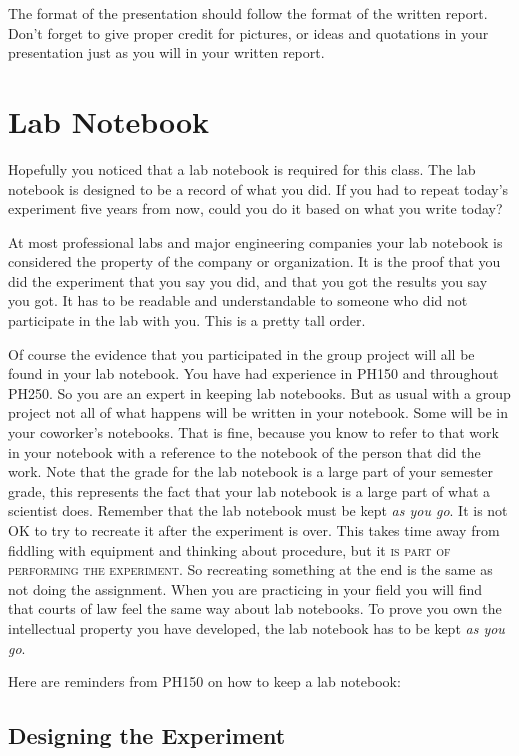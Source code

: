 The format of the presentation should follow the format of the written
report. Don't forget to give proper credit for pictures, or ideas and
quotations in your presentation just as you will in your written report.

\section{Lab Notebook}

Hopefully you noticed that a lab notebook is required for this class. The
lab notebook is designed to be a record of what you did. If you had to
repeat today's experiment five years from now, could you do it based on what
you write today?

At most professional labs and major engineering companies your lab notebook
is considered the property of the company or organization. It is the proof
that you did the experiment that you say you did, and that you got the
results you say you got. It has to be readable and understandable to someone
who did not participate in the lab with you. This is a pretty tall order.

Of course the evidence that you participated in the group project will all
be found in your lab notebook. You have had experience in PH150 and
throughout PH250. So you are an expert in keeping lab notebooks. But as
usual with a group project not all of what happens will be written in your
notebook. Some will be in your coworker's notebooks. That is fine, because
you know to refer to that work in your notebook with a reference to the
notebook of the person that did the work. Note that the grade for the lab
notebook is a {\Large large} part of your semester grade, this represents
the fact that your lab notebook is a {\Large large} part of what a scientist
does. Remember that the lab notebook must be kept \emph{as you go}. It is
not OK to try to recreate it after the experiment is over. This takes time
away from fiddling with equipment and thinking about procedure, but it 
\textsc{is part of performing the experiment.} So recreating something at
the end is the same as not doing the assignment. When you are practicing in
your field you will find that courts of law feel the same way about lab
notebooks. To prove you own the intellectual property you have developed,
the lab notebook has to be kept \emph{as you go}.

Here are reminders from PH150 on how to keep a lab notebook:

\subsection{Designing the Experiment}

